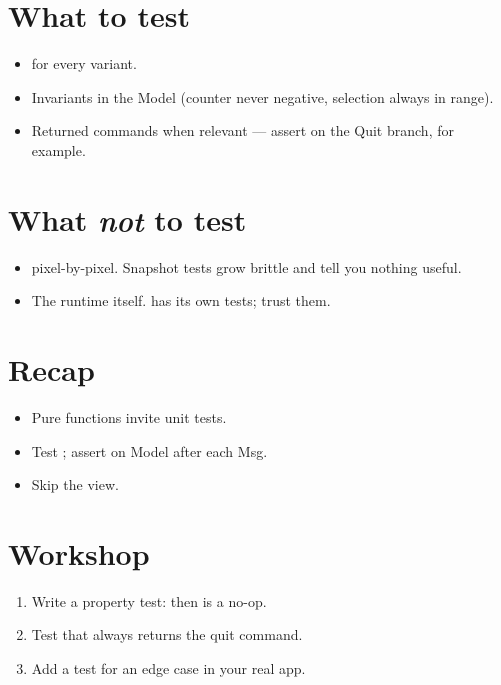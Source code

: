 \section{What to test}

\begin{itemize}[leftmargin=*]
  \item {} for every  variant.
  \item Invariants in the Model (counter never negative,
    selection always in range).
  \item Returned commands when relevant — assert
     on the Quit branch, for example.
\end{itemize}

\section{What \emph{not} to test}

\begin{itemize}[leftmargin=*]
  \item {} pixel-by-pixel. Snapshot tests grow
    brittle and tell you nothing useful.
  \item The runtime itself. \maya{} has its own tests; trust
    them.
\end{itemize}

\section{Recap}

\begin{recap}
\begin{itemize}[leftmargin=*]
  \item Pure functions invite unit tests.
  \item Test ; assert on Model after each Msg.
  \item Skip the view.
\end{itemize}
\end{recap}

\section*{Workshop}

\begin{enumerate}[leftmargin=*]
  \item Write a property test:  then 
    is a no-op.
  \item Test that  always returns the quit
    command.
  \item Add a test for an edge case in your real app.
\end{enumerate}
